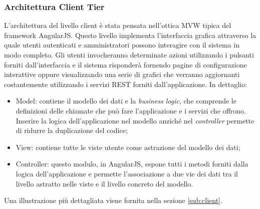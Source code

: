 		\subsubsection{Architettura Client Tier}
		L'architettura del livello client è stata pensata nell'ottica MVW tipica del framework AngularJS. Questo livello implementa l'interfaccia grafica attraverso la quale utenti autenticati e amministratori possono interagire con il sistema in modo completo.
		\newline
		Gli utenti invocheranno determinate azioni utilizzando i pulsanti forniti dall'interfaccia e il sistema risponderà fornendo pagine di configurazione interattive oppure visualizzando una serie di grafici che verranno aggiornanti costantemente utilizzando i servizi REST forniti dall'applicazione. In dettaglio:
		\begin{itemize}
			\item Model: contiene il modello dei dati e la \textit{business logic}, che comprende le definizioni delle chiamate che può fare l'applicazione e i servizi che offrono. Inserire la logica dell'applicazione nel modello anziché nel \textit{controller} permette di ridurre la duplicazione del codice;
			\item View: contiene tutte le viste utente come astrazione del modello dei dati;
			\item Controller: questo modulo, in AngularJS, espone tutti i metodi forniti dalla logica dell'applicazione e permette l'associazione a due vie dei dati tra il livello astratto nelle viste e il livello concreto del modello.
		\end{itemize}
		\noindent
		Una illustrazione più dettagliata viene fornita nella sezione \ref{sub:client}.

